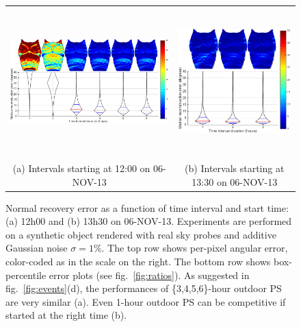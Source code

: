 \begin{figure}[t]
    \centering
    \footnotesize
    \begin{tabular}{cc}
        \includegraphics[height=5.7cm]{./figures/owl/owl-12h.pdf} & 
        \includegraphics[height=5.7cm]{./figures/owl/owl-13h30.pdf} \\
        (a) Intervals starting at 12:00 on 06-NOV-13 & (b) Intervals starting at 13:30 on 06-NOV-13
    \end{tabular}
    \vspace{1mm}
    \caption{Normal recovery error as a function of time interval and start time: (a) 12h00 and (b) 13h30 on 06-NOV-13. Experiments are performed on a synthetic object rendered with real sky probes and additive Gaussian noise $\sigma=1\%$. The top row shows per-pixel angular error, color-coded as in the scale on the right. The bottom row shows box-percentile error plots (see fig.~\ref{fig:ratios}). As suggested in fig.~\ref{fig:events}(d), the performances of \{3,4,5,6\}-hour outdoor PS are very similar (a). Even 1-hour outdoor PS can be competitive if started at the right time (b).}
    \label{fig:owl-results}
    \vspace{-3mm}
\end{figure}

